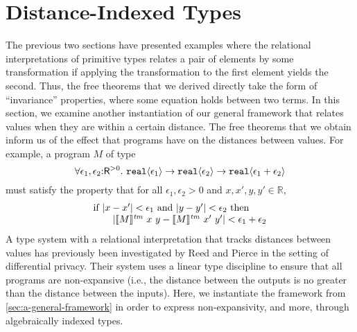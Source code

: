 \section{Distance-Indexed Types}
\label{sec:metric-types}

\newcommand{\Metric}{\mathit{Met}}
\newcommand{\metricSort}{\mathsf{R}^{>0}}

The previous two sections have presented examples where the relational
interpretations of primitive types relates a pair of elements by some
transformation if applying the transformation to the first element
yields the second. Thus, the free theorems that we derived directly
take the form of ``invariance'' properties, where some equation holds
between two terms. In this section, we examine another instantiation
of our general framework that relates values when they are within a
certain distance. The free theorems that we obtain inform us of the
effect that programs have on the distances between values. For
example, a program $M$ of type
\begin{displaymath}
  \forall \epsilon_1,\epsilon_2\mathord:\metricSort.\ \tyPrim{real}{\epsilon_1} \to \tyPrim{real}{\epsilon_2} \to \tyPrim{real}{\epsilon_1 + \epsilon_2}
\end{displaymath}
must satisfy the property that for all $\epsilon_1, \epsilon_2 > 0$
and $x, x', y, y' \in \mathbb{R}$,
\begin{displaymath} %
  \begin{array}{l}
    \textrm{if }|x - x'| < \epsilon_1 \textrm{ and } |y - y'| < \epsilon_2 \textrm{ then}\\
    \hspace{2em}|\tmSem{M}\ x\ y - \tmSem{M}\ x'\ y'| < \epsilon_1 + \epsilon_2
  \end{array}
\end{displaymath}
A type system with a relational interpretation that tracks distances
between values has previously been investigated by Reed and Pierce
\cite{reed10distance} in the setting of differential privacy. Their
system uses a linear type discipline to ensure that all programs are
non-expansive (i.e., the distance between the outputs is no greater
than the distance between the inputs). Here, we instantiate the
framework from \autoref{sec:a-general-framework} in order to express
non-expansivity, and more, through algebraically indexed types.

